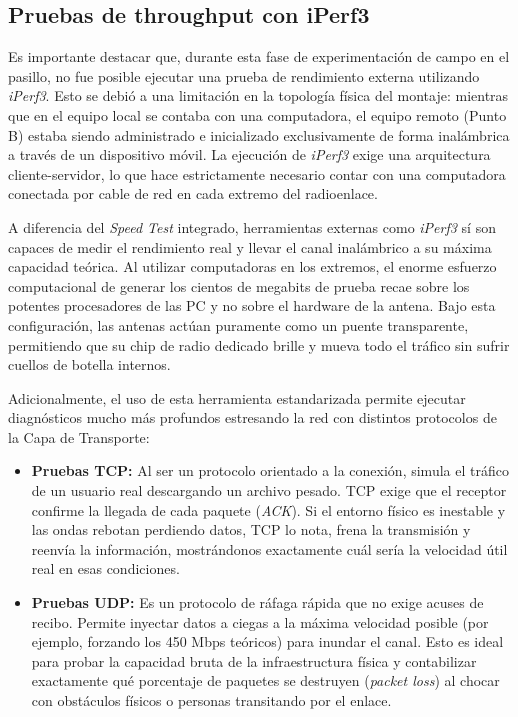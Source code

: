 \subsection{Pruebas de throughput con iPerf3}
\label{sec_3.9}

Es importante destacar que, durante esta fase de experimentación de campo en el pasillo, no fue posible ejecutar una prueba de rendimiento externa utilizando \textit{iPerf3}. Esto se debió a una limitación en la topología física del montaje: mientras que en el equipo local se contaba con una computadora, el equipo remoto (Punto B) estaba siendo administrado e inicializado exclusivamente de forma inalámbrica a través de un dispositivo móvil. La ejecución de \textit{iPerf3} exige una arquitectura cliente-servidor, lo que hace estrictamente necesario contar con una computadora conectada por cable de red en cada extremo del radioenlace.

A diferencia del \textit{Speed Test} integrado, herramientas externas como \textit{iPerf3} sí son capaces de medir el rendimiento real y llevar el canal inalámbrico a su máxima capacidad teórica. Al utilizar computadoras en los extremos, el enorme esfuerzo computacional de generar los cientos de megabits de prueba recae sobre los potentes procesadores de las PC y no sobre el hardware de la antena. Bajo esta configuración, las antenas actúan puramente como un puente transparente, permitiendo que su chip de radio dedicado brille y mueva todo el tráfico sin sufrir cuellos de botella internos.

Adicionalmente, el uso de esta herramienta estandarizada permite ejecutar diagnósticos mucho más profundos estresando la red con distintos protocolos de la Capa de Transporte:

\begin{itemize}
    \item \textbf{Pruebas TCP:} Al ser un protocolo orientado a la conexión, simula el tráfico de un usuario real descargando un archivo pesado. TCP exige que el receptor confirme la llegada de cada paquete (\textit{ACK}). Si el entorno físico es inestable y las ondas rebotan perdiendo datos, TCP lo nota, frena la transmisión y reenvía la información, mostrándonos exactamente cuál sería la velocidad útil real en esas condiciones.
    
    \item \textbf{Pruebas UDP:} Es un protocolo de ráfaga rápida que no exige acuses de recibo. Permite inyectar datos a ciegas a la máxima velocidad posible (por ejemplo, forzando los 450 Mbps teóricos) para inundar el canal. Esto es ideal para probar la capacidad bruta de la infraestructura física y contabilizar exactamente qué porcentaje de paquetes se destruyen (\textit{packet loss}) al chocar con obstáculos físicos o personas transitando por el enlace.
\end{itemize}



